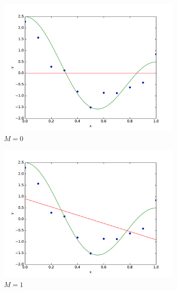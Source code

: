 \documentclass[psamsfonts]{amsart}
\theoremstyle{definition}
\theoremstyle{remark}
\numberwithin{equation}{section}
\begin{document}
\begin{figure}
	\centering
	\begin{subfigure}[b]{0.24\textwidth}
		\includegraphics[width=\textwidth]{hw1_2-1_0.pdf}
		\caption{$M=0$}
	\end{subfigure}
	\begin{subfigure}[b]{0.24\textwidth}
		\includegraphics[width=\textwidth]{hw1_2-1_1.pdf}
		\caption{$M=1$}
	\end{subfigure}
	\begin{subfigure}[b]{0.24\textwidth}

\end{subfigure}
\end{figure}
\end{document}
